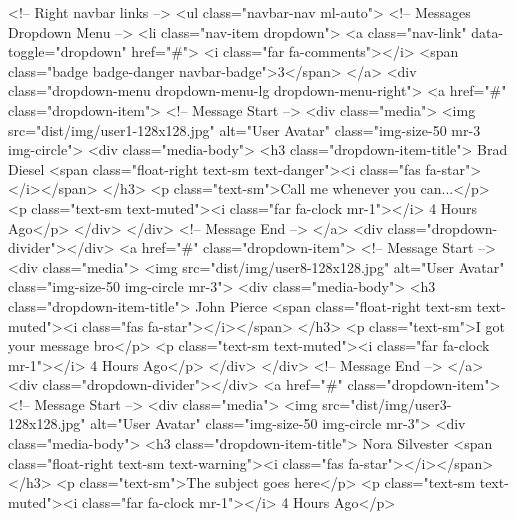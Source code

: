       <!-- Right navbar links -->
      <ul class="navbar-nav ml-auto">
        <!-- Messages Dropdown Menu -->
        <li class="nav-item dropdown">
          <a class="nav-link" data-toggle="dropdown" href="#">
            <i class="far fa-comments"></i>
            <span class="badge badge-danger navbar-badge">3</span>
          </a>
          <div class="dropdown-menu dropdown-menu-lg dropdown-menu-right">
            <a href="#" class="dropdown-item">
              <!-- Message Start -->
              <div class="media">
                <img src="dist/img/user1-128x128.jpg" alt="User Avatar" class="img-size-50 mr-3 img-circle">
                <div class="media-body">
                  <h3 class="dropdown-item-title">
                    Brad Diesel
                    <span class="float-right text-sm text-danger"><i class="fas fa-star"></i></span>
                  </h3>
                  <p class="text-sm">Call me whenever you can...</p>
                  <p class="text-sm text-muted"><i class="far fa-clock mr-1"></i> 4 Hours Ago</p>
                </div>
              </div>
              <!-- Message End -->
            </a>
            <div class="dropdown-divider"></div>
            <a href="#" class="dropdown-item">
              <!-- Message Start -->
              <div class="media">
                <img src="dist/img/user8-128x128.jpg" alt="User Avatar" class="img-size-50 img-circle mr-3">
                <div class="media-body">
                  <h3 class="dropdown-item-title">
                    John Pierce
                    <span class="float-right text-sm text-muted"><i class="fas fa-star"></i></span>
                  </h3>
                  <p class="text-sm">I got your message bro</p>
                  <p class="text-sm text-muted"><i class="far fa-clock mr-1"></i> 4 Hours Ago</p>
                </div>
              </div>
              <!-- Message End -->
            </a>
            <div class="dropdown-divider"></div>
            <a href="#" class="dropdown-item">
              <!-- Message Start -->
              <div class="media">
                <img src="dist/img/user3-128x128.jpg" alt="User Avatar" class="img-size-50 img-circle mr-3">
                <div class="media-body">
                  <h3 class="dropdown-item-title">
                    Nora Silvester
                    <span class="float-right text-sm text-warning"><i class="fas fa-star"></i></span>
                  </h3>
                  <p class="text-sm">The subject goes here</p>
                  <p class="text-sm text-muted"><i class="far fa-clock mr-1"></i> 4 Hours Ago</p>
